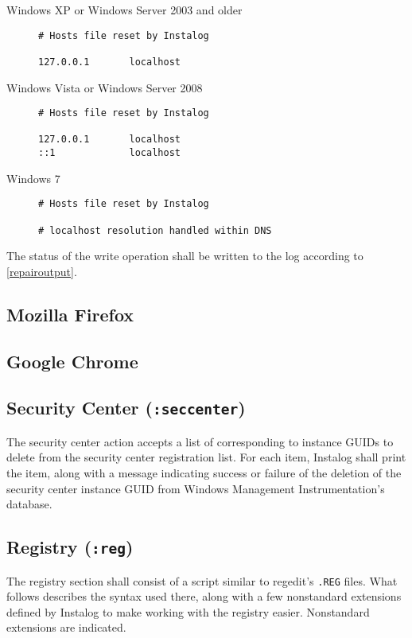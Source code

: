 \begin{description}
\item[Windows XP or Windows Server 2003 and older] \hfill 
\begin{verbatim}
# Hosts file reset by Instalog

127.0.0.1       localhost
\end{verbatim}
\item[Windows Vista or Windows Server 2008] \hfill 
\begin{verbatim}
# Hosts file reset by Instalog

127.0.0.1       localhost
::1             localhost
\end{verbatim}
\item[Windows 7] \hfill 
\begin{verbatim}
# Hosts file reset by Instalog

# localhost resolution handled within DNS
\end{verbatim}
\end{description}

The status of the write operation shall be written to the log according to
\ref{repairoutput}.  

\subsection{Mozilla Firefox}

\subsection{Google Chrome}

\subsection{Security Center (\texttt{:seccenter})}
The security center action accepts a list of  corresponding to
instance GUIDs to delete from the security center registration list. For each
item, Instalog shall print the item, along with a message indicating success or
failure of the deletion of the security center instance GUID from Windows
Management Instrumentation's database.

\subsection{Registry (\texttt{:reg})}
The registry section shall consist of a script similar to regedit's \verb|.REG|
files. What follows describes the syntax used there, along with a few
nonstandard extensions defined by Instalog to make working with the registry
easier. Nonstandard extensions are indicated.

